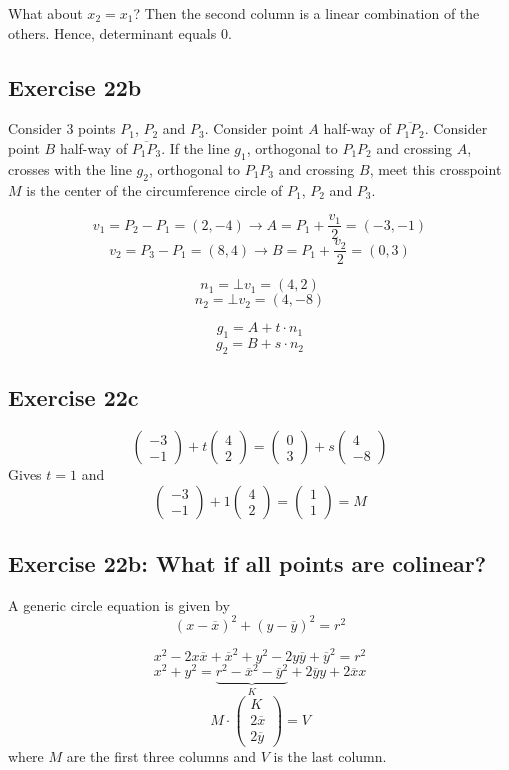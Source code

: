 \documentclass[a4paper]{article}
\theoremstyle{definition}
\newcommand\vectwo[2]{\begin{pmatrix} #1 \\ #2 \end{pmatrix}}
\begin{document}
What about $x_2 = x_1$? Then the second column is a linear combination of the others. Hence, determinant equals 0.

\subsection{Exercise 22b}

Consider 3 points $P_1$, $P_2$ and $P_3$.
Consider point $A$ half-way of $\overline{P_1 P_2}$.
Consider point $B$ half-way of $\overline{P_1 P_3}$.
If the line $g_1$, orthogonal to $P_1 P_2$ and crossing $A$, crosses with the line $g_2$,
orthogonal to $P_1 P_3$ and crossing $B$, meet this crosspoint $M$ is the center of the circumference circle of $P_1$, $P_2$ and $P_3$.

\[ v_1 = P_2 - P_1 = (2, -4) \to A = P_1 + \frac{v_1}{2} = (-3, -1) \]
\[ v_2 = P_3 - P_1 = (8, 4) \to B = P_1 + \frac{v_2}{2} = (0, 3) \]

\[ n_1 = \bot v_1 = (4, 2) \]
\[ n_2 = \bot v_2 = (4, -8) \]

\[ g_1 = A + t \cdot n_1 \]
\[ g_2 = B + s \cdot n_2 \]

\subsection{Exercise 22c}

\[ \vectwo{-3}{-1} + t \vectwo42 = \vectwo03 + s\vectwo{4}{-8} \]
Gives $t=1$ and
\[ \vectwo{-3}{-1} + 1 \vectwo42 = \vectwo11 = M \]

\subsection{Exercise 22b: What if all points are colinear?}

A generic circle equation is given by
\[ (x - \overline x)^2 + (y - \overline y)^2 = r^2 \]

\[ x^2 - 2x \overline x + \overline x^2 + y^2 - 2y\overline y + \overline y^2 = r^2 \]
\[ x^2 + y^2 = \underbrace{r^2 - \overline x^2 - \overline y^2}_{K} + 2 \overline y y + 2 \overline x x \]
\[ M \cdot \begin{pmatrix} K \\ 2 \overline x \\ 2 \overline y \end{pmatrix} = V \]
where $M$ are the first three columns and $V$ is the last column.
\end{document}
